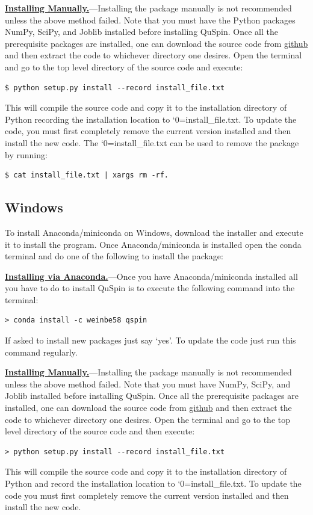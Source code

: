 \documentclass{SciPost}
\newcommand\0{\scalebox{-1}[1]{0}}
\let\svttfamily\ttfamily
\renewcommand\ttfamily{\svttfamily\catcode`0=\active }
\renewcommand\texttt{\bgroup\ttfamily\texttthelp}
\def\texttthelp#1{#1\egroup}
\begin{document}
\begin{appendix}
\underline{\bf Installing Manually.}---Installing the package manually is not recommended unless the above method failed. Note that you must have the Python packages NumPy, SciPy, and Joblib installed before installing QuSpin. Once all the prerequisite packages are installed, one can download the source code from \href{https://github.com/weinbe58/qspin/tree/master}{github} and then extract the code to whichever directory one desires. Open the terminal and go to the top level directory of the source code and execute:
\begin{lstlisting}[numbers=none,keywordstyle=\ttfamily]  
$ python setup.py install --record install_file.txt
\end{lstlisting}
This will compile the source code and copy it to the installation directory of Python recording the installation location to \texttt{install\_file.txt}. To update the code, you must first completely remove the current version installed and then install the new code. The \texttt{install\_file.txt} can be used to remove the package by running:  
\begin{lstlisting}[numbers=none,keywordstyle=\ttfamily]  
$ cat install_file.txt | xargs rm -rf. 
\end{lstlisting}

\subsection{Windows}
To install Anaconda/miniconda on Windows, download the installer and execute it to install the program. Once Anaconda/miniconda is installed open the conda terminal and do one of the following to install the package:

\underline{\bf Installing via Anaconda.}---Once you have Anaconda/miniconda installed all you have to do to install QuSpin is to execute the following command into the terminal: 
\begin{lstlisting}[numbers=none,keywordstyle=\ttfamily]
> conda install -c weinbe58 qspin
\end{lstlisting}
If asked to install new packages just say `yes'. To update the code just run this command regularly. 

\underline{\bf Installing Manually.}---Installing the package manually is not recommended unless the above method failed. Note that you must have NumPy, SciPy, and Joblib installed before installing QuSpin. Once all the prerequisite packages are installed, one can download the source code from \href{https://github.com/weinbe58/qspin/tree/master}{github} and then extract the code to whichever directory one desires. Open the terminal and go to the top level directory of the source code and then execute:  
\begin{lstlisting}[numbers=none,keywordstyle=\ttfamily]
> python setup.py install --record install_file.txt
\end{lstlisting}
This will compile the source code and copy it to the installation directory of Python and record the installation location to \texttt{install\_file.txt}. To update the code you must first completely remove the current version installed and then install the new code. 



\end{appendix}
\end{document}
